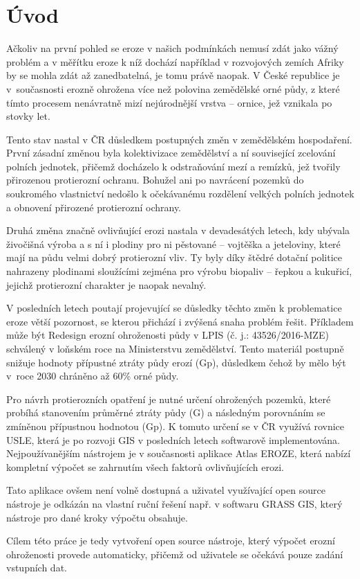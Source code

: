 \chapter{Úvod}

Ačkoliv na první pohled se eroze v našich podmínkách nemusí zdát jako
vážný problém a v měřítku eroze k níž dochází například v rozvojových
zemích Afriky by se mohla zdát až zanedbatelná, je tomu právě
naopak. V České republice je v~současnosti erozně ohrožena více než
polovina zemědělské orné půdy, z které tímto procesem nenávratně mizí
nejúrodnější vrstva – ornice, jež vznikala po stovky let.

Tento stav nastal v ČR důsledkem postupných změn v zemědělském
hospodaření. První zásadní změnou byla kolektivizace zemědělství a ní
související zcelování polních jednotek, přičemž docházelo k
odstraňování mezí a remízků, jež tvořily přiroze\-nou protierozní
ochranu. Bohužel ani po navrácení pozemků do soukromého vlastnictví
nedošlo k očekávanému rozdělení velkých polních jednotek a obnovení
přirozené protierozní ochrany.

Druhá změna značně ovlivňující erozi nastala v devadesátých letech,
kdy ubývala živočišná výroba a s ní i plodiny pro ni pěstované –
vojtěška a jeteloviny, které mají na půdu velmi dobrý protierozní
vliv. Ty byly díky štědré dotační politice nahrazeny plodinami
sloužícími zejména pro výrobu biopaliv – řepkou a kukuřicí, jejichž
protierozní charakter je naopak nevalný.

V posledních letech poutají projevující se důsledky těchto změn k
problematice eroze větší pozornost, se kterou přichází i zvýšená snaha
problém řešit. Příkladem může být Redesign erozní ohroženosti půdy v
LPIS (č. j.: 43526/2016-MZE) schválený v loňském roce na Ministerstvu
zemědělství. Tento materiál postupně snižuje hodnoty přípustné ztráty
půdy erozí (Gp), důsledkem čehož by mělo být v~roce 2030 chráněno až
60\% orné půdy.\cite{kalkulacka}

Pro návrh protierozních opatření je nutné určení ohrožených pozemků,
které probíhá stanovením průměrné ztráty půdy (G) a následným
porovnáním se zmíněnou přípustnou hodnotou (Gp). K tomuto určení se v
ČR využívá rovnice USLE, která je po rozvoji GIS v posledních letech
softwarově implementována. Nejpoužívanějším nástrojem je v současnosti
aplikace Atlas EROZE, která nabízí kompletní výpočet se zahrnutím
všech faktorů ovlivňujících erozi.

Tato aplikace ovšem není volně dostupná a uživatel využívající open
source nástroje je odkázán na vlastní ruční řešení např. v softwaru
GRASS GIS, který nástroje pro dané kroky výpočtu obsahuje.

Cílem této práce je tedy vytvoření open source nástroje, který výpočet
erozní ohroženosti provede automaticky, přičemž od uživatele se
očekává pouze zadání vstupních dat.
